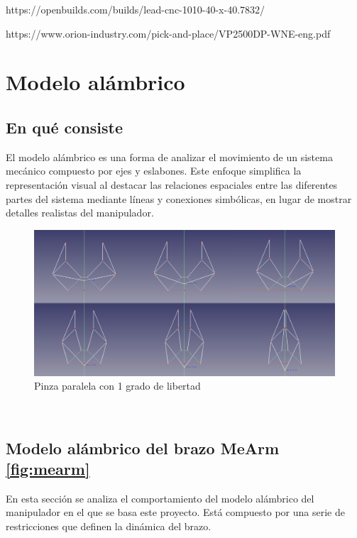 \begin{enumerate}
https://openbuilds.com/builds/lead-cnc-1010-40-x-40.7832/

https://www.orion-industry.com/pick-and-place/VP2500DP-WNE-eng.pdf

\end{enumerate}

\section{Modelo alámbrico}
\subsection{En qué consiste}
\label{subsec:eqc_mod_alambrico}
El modelo alámbrico es una forma de analizar el movimiento de un sistema mecánico compuesto por ejes y eslabones. Este 
enfoque simplifica la representación visual al destacar las relaciones espaciales entre las diferentes partes del sistema mediante 
líneas y conexiones simbólicas, en lugar de mostrar detalles realistas del manipulador. 
\begin{figure} [h!]
  \begin{center}
    \includegraphics[width=15cm]{figs/pinza_evol.png}
  \end{center}
  \caption{Pinza paralela con 1 grado de libertad}
  \label{fig:mod_pinza_figure}
\end{figure}\ 

\subsection{Modelo alámbrico del brazo MeArm \ref{fig:mearm}}
\label{subsec:mod_mearm}
En esta sección se analiza el comportamiento del modelo alámbrico del manipulador en el que se basa este proyecto.
Está compuesto por una serie de restricciones que definen la dinámica del brazo.


